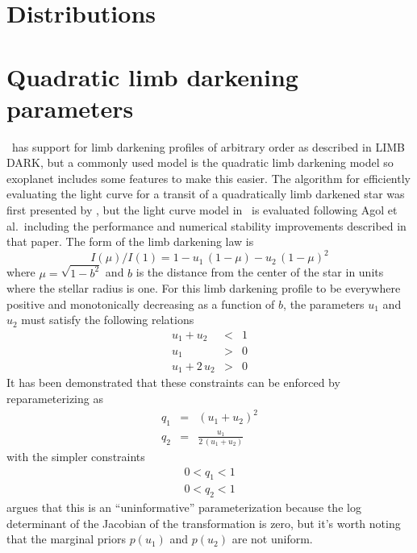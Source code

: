 \documentclass[modern]{aastex62}
\begin{document}
\section{Distributions}

\section{Quadratic limb darkening parameters}

\exoplanet\ has support for limb darkening profiles of arbitrary order as described in LIMB DARK, but a commonly used model is the quadratic limb darkening model so exoplanet includes some features to make this easier.
The algorithm for efficiently evaluating the light curve for a transit of a quadratically limb darkened star was first presented by \citet{Mandel:2002}, but the light curve model in \exoplanet\ is evaluated following Agol et al.\ including the performance and numerical stability improvements described in that paper.
The form of the limb darkening law is
\begin{equation}
I(\mu)/I(1) = 1 - u_1\,(1 - \mu) - u_2\,(1 - \mu)^2
\end{equation}
where $\mu = \sqrt{1 - b^2}$ and $b$ is the distance from the center of the star in units where the stellar radius is one.
For this limb darkening profile to be everywhere positive and monotonically decreasing as a function of $b$, the parameters $u_1$ and $u_2$ must satisfy the following relations
\begin{eqnarray}
u_1 + u_2 &<& 1 \\
u_1 &>& 0 \\
u_1 + 2\,u_2 &>& 0
\end{eqnarray}
It has been demonstrated \citep[by][]{Kipping:2013} that these constraints can be enforced by reparameterizing as
\begin{eqnarray}
q_1 &=& (u_1 + u_2)^2 \\
q_2 &=& \frac{u_1}{2\,(u_1 + u_2)}
\end{eqnarray}
with the simpler constraints
\begin{eqnarray}
0 < q_1 < 1 \\
0 < q_2 < 1
\end{eqnarray}
\citet{Kipping:2013} argues that this is an ``uninformative'' parameterization because the log determinant of the Jacobian of the transformation is zero,  but it's worth noting that the marginal priors $p(u_1)$ and $p(u_2)$ are not uniform.
\end{document}
